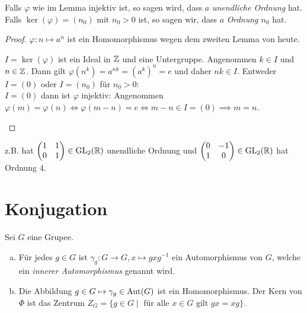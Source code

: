 \begin{definition}
	Falls $\varphi$ wie im Lemma injektiv ist, so sagen wird, dass $a$ \emph{unendliche Ordnung} hat.
	Falls $\ker(\varphi) = (n_0)$ mit $n_0 > 0$ ist, so sagen wir, dass $a$ \emph{Ordnung $n_0$} hat.
\end{definition}

\begin{proof}
	$\varphi: n \mapsto a^{n}$ ist ein Homomorphismus wegen dem zweiten Lemma von heute.
	\begin{remark}
		$I = \ker(\varphi)$ ist ein Ideal in $\mathbb{Z}$ und eine Untergruppe.
		Angenommen  $k \in I$ und $n \in \mathbb{Z}$. Dann gilt $\varphi(n^{k}) = a^{nk} = (a^{k})^{n} = e$ und daher $nk \in I$.
		Entweder $I = (0)$ oder $I = (n_0)$ für $n_0 > 0$:\\
		$I = (0)$ dann ist $\varphi$ injektiv:
		Angenommen $\varphi(m) = \varphi(n) \Leftrightarrow \varphi(m-n) = e \Leftrightarrow m-n \in I = (0) \implies m=n$.
	\end{remark}
\end{proof}

\begin{eg}
	z.B. hat
	$\begin{pmatrix} 
		1 & 1\\ 0 &1
	\end{pmatrix} \in \operatorname{GL}_2(\mathbb{R})$ unendliche Ordnung und  $\begin{pmatrix} 
		0 &-1\\ 1 & 0
	\end{pmatrix} \in \operatorname{GL}_2(\mathbb{R})$ hat Ordnung $4$.
\end{eg}

\section{Konjugation}

\begin{lemma}
	Sei $G$ eine Grupee.
	\begin{enumerate}[a)]
		\item Für jedes $g \in G$ ist $\gamma_{g}: G \to G, x \mapsto g x g^{-1}$ ein Automorphismus von $G$, welche ein \emph{innerer Automorphismus} genannt wird.
		\item Die Abbildung $g \in G \mapsto \gamma_{g} \in \operatorname{Aut}(G)$ ist ein Homomorphismus.
			Der Kern von $\Phi$ ist das Zentrum $Z_{G} = \{g \in G \mid \text{ für alle $x \in G$ gilt } gx = xg\} $.
	\end{enumerate}
\end{lemma}

